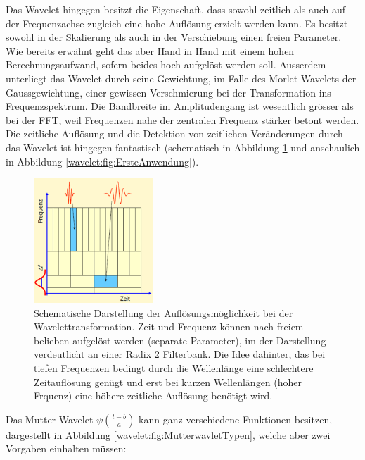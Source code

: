 Das Wavelet hingegen besitzt die Eigenschaft, dass sowohl zeitlich als auch auf der Frequenzachse zugleich eine hohe Auflösung erzielt werden kann. Es besitzt sowohl in der Skalierung als auch in der Verschiebung einen freien Parameter. Wie bereits erwähnt geht das aber Hand in Hand mit einem hohen Berechnungsaufwand, sofern beides hoch aufgelöst werden soll. Ausserdem unterliegt das Wavelet durch seine Gewichtung, im Falle des Morlet Wavelets der Gaussgewichtung, einer gewissen Verschmierung bei der Transformation ins Frequenzspektrum. Die Bandbreite im Amplitudengang ist wesentlich grösser als bei der FFT, weil Frequenzen nahe der zentralen Frequenz stärker betont werden. Die zeitliche Auflösung und die Detektion von zeitlichen Veränderungen durch das Wavelet ist hingegen fantastisch (schematisch in Abbildung \ref{wavelet:fig:CWTAufloesungRadix2} und anschaulich in Abbildung \ref{wavelet:fig:ErsteAnwendung}).

\begin{figure}
	\centering
	\includegraphics[width=0.4\textwidth]{papers/wavelets/images/6-3_CWTAufloesungRadix2.png}
	\caption{\cite{wavelets:J.Mayer.2002} Schematische Darstellung der Auflösungsmöglichkeit bei der Wavelettransformation. Zeit und Frequenz können nach freiem belieben aufgelöst werden (separate Parameter), im der Darstellung verdeutlicht an einer Radix 2 Filterbank. Die Idee dahinter, das bei tiefen Frequenzen bedingt durch die Wellenlänge eine schlechtere Zeitauflösung genügt und erst bei kurzen Wellenlängen (hoher Frquenz) eine höhere zeitliche Auflösung benötigt wird.}
	\label{wavelet:fig:CWTAufloesungRadix2}
\end{figure}

Das Mutter-Wavelet $\psi\left(\frac{t-b}{a}\right)$ kann ganz verschiedene Funktionen besitzen, dargestellt in Abbildung \ref{wavelet:fig:MutterwavletTypen}, welche aber zwei Vorgaben einhalten müssen:

